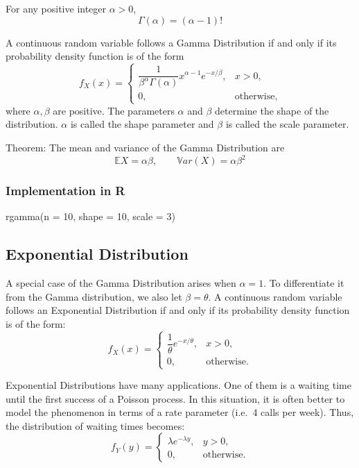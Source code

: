 \documentclass[
  letterpaper,
  DIV=11,
  numbers=noendperiod]{scrreprt}
\newenvironment{Shaded}{\begin{snugshade}}{\end{snugshade}}
\newcommand{\AttributeTok}[1]{\textcolor[rgb]{0.40,0.45,0.13}{#1}}
\newcommand{\DecValTok}[1]{\textcolor[rgb]{0.68,0.00,0.00}{#1}}
\newcommand{\FunctionTok}[1]{\textcolor[rgb]{0.28,0.35,0.67}{#1}}
\newcommand{\NormalTok}[1]{\textcolor[rgb]{0.00,0.23,0.31}{#1}}
\begin{document}
For any positive integer \(\alpha > 0\),
\[\Gamma(\alpha) = (\alpha - 1)!\]

A continuous random variable follows a Gamma Distribution if and only if
its probability density function is of the form \[f_X(x) =
\begin{cases}
\dfrac{1}{\beta^{\alpha}\Gamma(\alpha)} x^{\alpha - 1} e^{-x/\beta}, & x > 0, \\[2ex]
0, & \text{otherwise},
\end{cases}\] where \(\alpha, \beta\) are positive. The parameters
\(\alpha\) and \(\beta\) determine the shape of the distribution.
\(\alpha\) is called the shape parameter and \(\beta\) is called the
scale parameter.

Theorem: The mean and variance of the Gamma Distribution are
\[\mathbb{E}X = \alpha \beta,
\qquad
\mathbb{V}ar(X) = \alpha \beta^2\]

\subsubsection{Implementation in R}\label{implementation-in-r-5}

\begin{Shaded}
\begin{Highlighting}[]
\FunctionTok{rgamma}\NormalTok{(}\AttributeTok{n =} \DecValTok{10}\NormalTok{, }\AttributeTok{shape =} \DecValTok{10}\NormalTok{, }\AttributeTok{scale =} \DecValTok{3}\NormalTok{)}
\end{Highlighting}
\end{Shaded}

\subsection{Exponential Distribution}\label{exponential-distribution}

A special case of the Gamma Distribution arises when \(\alpha = 1\). To
differentiate it from the Gamma distribution, we also let
\(\beta = \theta\). A continuous random variable follows an Exponential
Distribution if and only if its probability density function is of the
form: \[f_X(x) =
\begin{cases}
\dfrac{1}{\theta} e^{-x/\theta}, & x > 0, \\[2ex]
0, & \text{otherwise}.
\end{cases}\]

Exponential Distributions have many applications. One of them is a
waiting time until the first success of a Poisson process. In this
situation, it is often better to model the phenomenon in terms of a rate
parameter (i.e.~4 calls per week). Thus, the distribution of waiting
times becomes: \[
f_Y(y) =
\begin{cases}
\lambda e^{-\lambda y}, & y > 0, \\[2ex]
0, & \text{otherwise}.
\end{cases}\]
\end{document}
